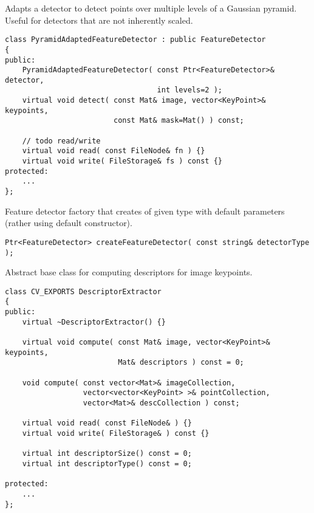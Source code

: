 Adapts a detector to detect points over multiple levels of a Gaussian
pyramid. Useful for detectors that are not inherently scaled.

\begin{lstlisting}
class PyramidAdaptedFeatureDetector : public FeatureDetector
{
public:
    PyramidAdaptedFeatureDetector( const Ptr<FeatureDetector>& detector, 
                                   int levels=2 );
    virtual void detect( const Mat& image, vector<KeyPoint>& keypoints, 
                         const Mat& mask=Mat() ) const;

    // todo read/write
    virtual void read( const FileNode& fn ) {}
    virtual void write( FileStorage& fs ) const {}
protected:
    ...
};
\end{lstlisting}

Feature detector factory that creates  of given type with 
default parameters (rather using default constructor).

\begin{lstlisting}
Ptr<FeatureDetector> createFeatureDetector( const string& detectorType );
\end{lstlisting}

\begin{description}
\end{description}

Abstract base class for computing descriptors for image keypoints.

\begin{lstlisting}
class CV_EXPORTS DescriptorExtractor
{
public:
    virtual ~DescriptorExtractor() {}
    
    virtual void compute( const Mat& image, vector<KeyPoint>& keypoints,
                          Mat& descriptors ) const = 0;

    void compute( const vector<Mat>& imageCollection, 
                  vector<vector<KeyPoint> >& pointCollection, 
                  vector<Mat>& descCollection ) const;

    virtual void read( const FileNode& ) {}
    virtual void write( FileStorage& ) const {}

    virtual int descriptorSize() const = 0;
    virtual int descriptorType() const = 0;

protected:
    ...
};
\end{lstlisting}

